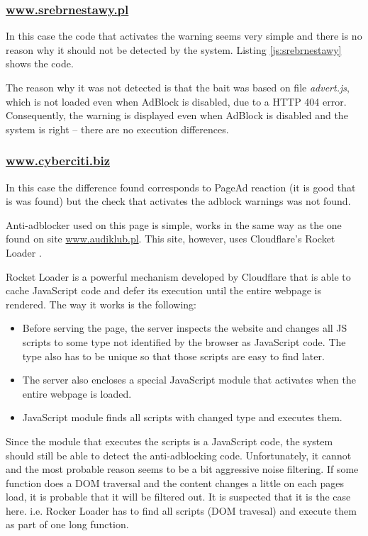 \subsubsection{\url{www.srebrnestawy.pl}}
In this case the code that activates the warning seems very simple and there is no reason why
it should not be detected by the system. Listing \ref{js:srebrnestawy} shows the code.



The reason why it was not detected is that the bait was based on file \emph{advert.js}, which is not loaded 
even when AdBlock is disabled, due to a HTTP 404 error. Consequently, the warning is displayed even 
when AdBlock is disabled and the system is right -- there are no execution differences.

\subsubsection{\url{www.cyberciti.biz}}
In this case the difference found corresponds to PageAd reaction (it is good that is was found)
but the check that activates the adblock warnings was not found.

Anti-adblocker used on this page is simple, works in the same way as the one found on site \url{www.audiklub.pl}.
This site, however, uses Cloudflare's Rocket Loader \cite{cloud-flare:rocket-loader}.

Rocket Loader is a powerful mechanism developed by Cloudflare that is able to cache JavaScript code and defer its execution 
until the entire webpage is rendered. The way it works is the following: 
\begin{itemize}
  \item  Before serving the page, the server inspects the website and changes all JS scripts 
            to some type not identified by the browser as JavaScript code.
            The type also has to be unique so that those scripts are easy to find later.
  \item The server also encloses a special JavaScript module that activates when the entire webpage is loaded.
  \item JavaScript module finds all scripts with changed type and executes them.
\end{itemize}

Since the module that executes the scripts is a JavaScript code, the system should still be able
to detect the anti-adblocking code. Unfortunately, it cannot and the most probable reason seems 
to be a bit aggressive noise filtering. If some function does a DOM traversal and
the content changes a little on each pages load, it is probable that it will be filtered out.
It is suspected that it is the case here. i.e. Rocker Loader has to find all scripts (DOM travesal) and execute them
as part of one long function.

